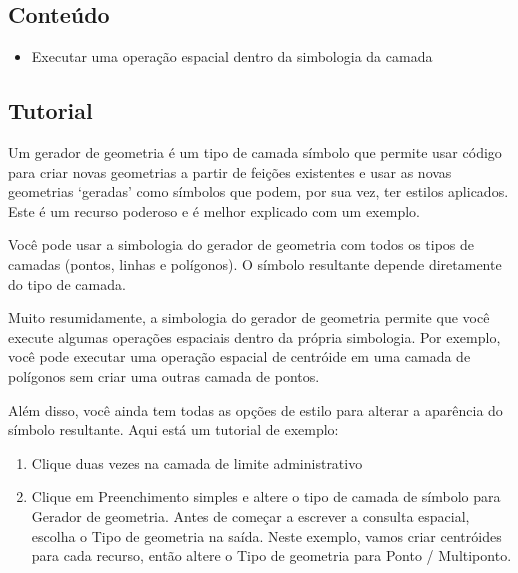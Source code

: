 \documentclass[
  portuguese,
]{krantz}
\providecommand{\tightlist}{%
  \setlength{\itemsep}{0pt}\setlength{\parskip}{0pt}}
\begin{document}
\hypertarget{conteuxfado-2}{%
\subsection{\texorpdfstring{\textbf{Conteúdo}}{Conteúdo}}\label{conteuxfado-2}}

\begin{itemize}
\tightlist
\item
  Executar uma operação espacial dentro da simbologia da camada
\end{itemize}

\hypertarget{tutorial-1}{%
\subsection{\texorpdfstring{\textbf{Tutorial}}{Tutorial}}\label{tutorial-1}}

Um gerador de geometria é um tipo de camada símbolo que permite usar código para criar novas geometrias a partir de feições existentes e usar as novas geometrias `geradas' como símbolos que podem, por sua vez, ter estilos aplicados. Este é um recurso poderoso e é melhor explicado com um exemplo.

Você pode usar a simbologia do gerador de geometria com todos os tipos de camadas (pontos, linhas e polígonos). O símbolo resultante depende diretamente do tipo de camada.

Muito resumidamente, a simbologia do gerador de geometria permite que você execute algumas operações espaciais dentro da própria simbologia. Por exemplo, você pode executar uma operação espacial de centróide em uma camada de polígonos sem criar uma outras camada de pontos.

Além disso, você ainda tem todas as opções de estilo para alterar a aparência do símbolo resultante. Aqui está um tutorial de exemplo:

\begin{enumerate}
\def\labelenumi{\arabic{enumi}.}
\tightlist
\item
  Clique duas vezes na camada de limite administrativo
\item
  Clique em Preenchimento simples e altere o tipo de camada de símbolo para Gerador de geometria. Antes de começar a escrever a consulta espacial, escolha o Tipo de geometria na saída. Neste exemplo, vamos criar centróides para cada recurso, então altere o Tipo de geometria para Ponto / Multiponto.
\end{enumerate}
\end{document}
